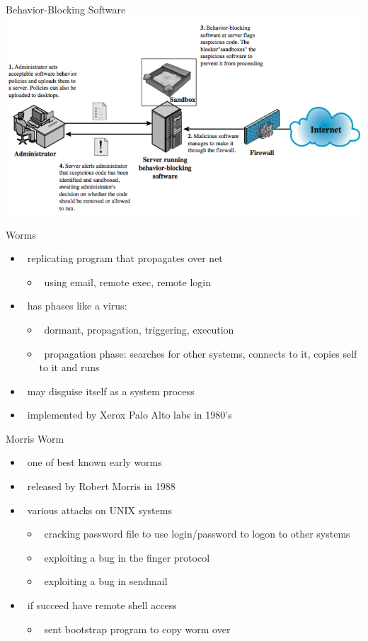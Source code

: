 \documentclass{beamer}
\begin{document}
\begin{frame}{Behavior-Blocking Software}
\includegraphics[width=0.8\linewidth]{behaviorBlocking}
\end{frame}

\begin{frame}{Worms}
  \begin{itemize}
  \item  replicating program that propagates over net 
    \begin{itemize}
    \item  using email, remote exec, remote login 
    \end{itemize}
  \item  has phases like a virus: 
    \begin{itemize}
    \item  dormant, propagation, triggering, execution 
    \item  propagation phase: searches for other systems, connects to 
      it, copies self to it and runs 
    \end{itemize}
  \item  may disguise itself as a system process 
  \item  implemented by Xerox Palo Alto labs in 1980's
  \end{itemize}
\end{frame}

\begin{frame}{Morris Worm}
  \begin{itemize}
  \item  one of best known early worms 
  \item  released by Robert Morris in 1988 
  \item  various attacks on UNIX systems 
    \begin{itemize}
    \item  cracking password file to use login/password to 
      logon to other systems 
    \item  exploiting a bug in the finger protocol 
    \item  exploiting a bug in sendmail 
    \end{itemize}
  \item  if succeed have remote shell access 
    \begin{itemize}
    \item  sent bootstrap program to copy worm over
    \end{itemize}
  \end{itemize}
\end{frame}
\end{document}
